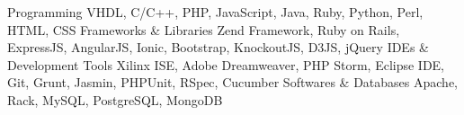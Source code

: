\begin{cvskills}
  \cvskill
    {Programming}
    {VHDL, C/C++, PHP, JavaScript, Java, Ruby, Python, Perl, HTML, CSS}
  \cvskill
  {Frameworks \& Libraries}
  {Zend Framework, Ruby on Rails, ExpressJS, AngularJS, Ionic, Bootstrap, KnockoutJS, D3JS, jQuery}  
  \cvskill
  {IDEs \& Development Tools}
  {Xilinx ISE, Adobe Dreamweaver, PHP Storm, Eclipse IDE, Git, Grunt, Jasmin, PHPUnit, RSpec, Cucumber}  
  \cvskill
  {Softwares \& Databases}
  {Apache, Rack, MySQL, PostgreSQL, MongoDB}      
    
\end{cvskills}
